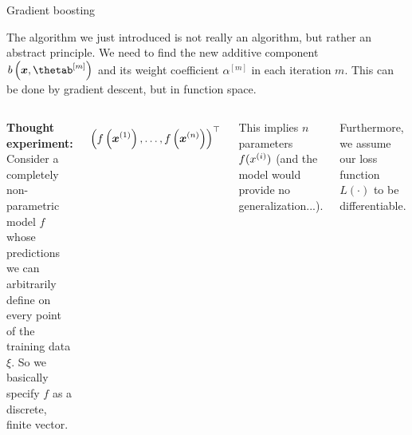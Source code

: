 
\begin{vbframe}{Gradient boosting}

\begin{footnotesize}
The algorithm we just introduced is not really an algorithm, but rather an abstract principle.
We need to find the new additive component $b\left(\xv, \thetam\right)$ and its
weight coefficient $\alpha^{[m]}$ in each iteration $m$.
This can be done by gradient descent, but in function space.

\lz
\begin{columns}
\column{5cm}
\textbf{Thought experiment:}
Consider a completely non-parametric model $f$ whose predictions we can arbitrarily define on every point of the training data $\xi$. So we basically specify
$f$ as a discrete, finite vector.

  $$\left(f\left(\bm{x}^{(1)}\right), \ldots,  f\left(\bm{x}^{(n)}\right)\right)^\top $$

This implies $n$ parameters $f(x^{(i)})$ (and the model would provide no generalization...).

Furthermore, we assume our loss function $L(\cdot)$ to be differentiable.

\column{5cm}
\begin{center}
  \vspace{-1cm}
  \includegraphics[width=\textwidth]{figure/fig-gb-concept-2.png}
\end{center}

\end{columns}
\end{footnotesize}
\end{vbframe}


